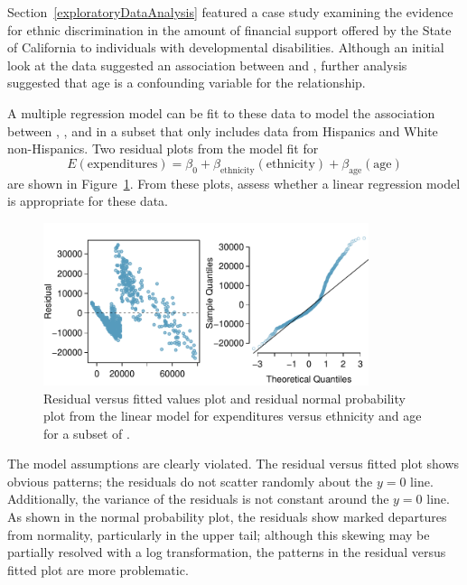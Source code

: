 \begin{example}{Section~\ref{exploratoryDataAnalysis} featured a case study examining the evidence for ethnic discrimination in the amount of financial support offered by the State of California to individuals with developmental disabilities. Although an initial look at the data suggested an association between  and , further analysis suggested that age is a confounding variable for the relationship.

A multiple regression model can be fit to these data to model the association between , , and  in a subset that only includes data from Hispanics and White non-Hispanics. Two residual plots from the model fit for 
\[E(\text{expenditures}) = \beta_0 +  \beta_{\text{ethnicity}}(\text{ethnicity}) + \beta_{\text{age}}(\text{age}) \]
are shown in Figure~\ref{ddsAgeEthnicityResidNormPlot}. From these plots, assess whether a linear regression model is appropriate for these data. 

\begin{figure}[h!]
	\centering
	\includegraphics[width=0.85\textwidth]
	{ch_multiple_linear_regression_oi_biostat/figures/ddsAgeEthnicityResidNormPlot/ddsAgeEthnicityResidNormPlot.pdf}
	\caption{Residual versus fitted values plot and residual normal probability plot from the linear model for expenditures versus ethnicity and age for a subset of .}
	\label{ddsAgeEthnicityResidNormPlot}
\end{figure}		
		
		
}

The model assumptions are clearly violated. The residual versus fitted plot	shows obvious patterns; the residuals do not scatter randomly about the $y = 0$ line. Additionally, the variance of the residuals is not constant around the $y = 0$ line. As shown in the normal probability plot, the residuals show marked departures from normality, particularly in the upper tail; although this skewing may be partially resolved with a log transformation, the patterns in the residual versus fitted plot are more problematic.


\end{example}

